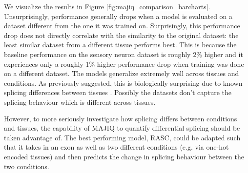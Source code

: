 We visualize the results in Figure \ref{fig:majiq_comparison_barcharts}.
Unsurprisingly, performance generally drops when a model is evaluated on a dataset different from the one it was trained on. Surprisingly, this performance drop does not directly correlate with the similarity to the original dataset: the least similar dataset from a different tissue performs best. 
This is because the baseline performance on the sensory neuron dataset is roughly 2\% higher and it experiences only a roughly 1\% higher performance drop when training was done on a different dataset. The models generalize extremely well across tissues and conditions. As previously suggested, this is biologically surprising due to known splicing differences between tissues \cite{crosstissuesplicing}. Possibly the datasets don't capture the splicing behaviour which is different across tissues.








However, to more seriously investigate how splicing differs between conditions and tissues, the capability of MAJIQ to quantify differential splicing should be taken advantage of. The best performing model, RASC, could be adapted such that it takes in an exon as well as two different conditions (e.g. via one-hot encoded tissues) and then predicts the change in splicing behaviour between the two conditions. 


%

















